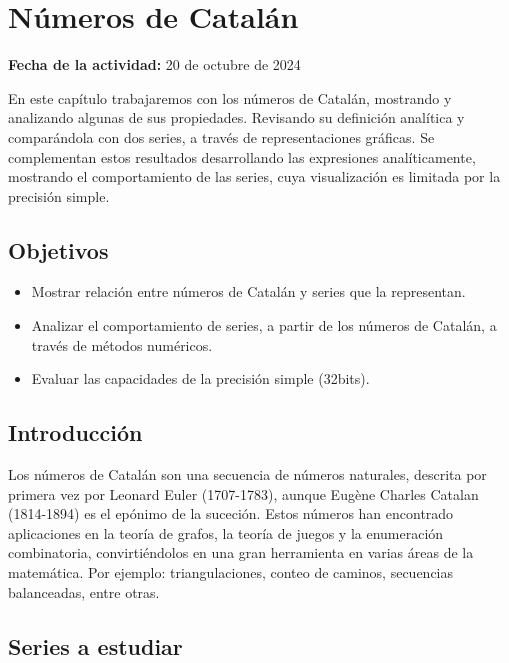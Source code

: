 \documentclass[../portafolio.tex]{subfiles}
\begin{document}
\chapter{Números de Catalán}
\label{g1_ej2}
\hfill \textbf{Fecha de la actividad:} 20 de octubre de 2024

\medskip

En este capítulo trabajaremos con los números de Catalán, mostrando y analizando algunas de sus propiedades. Revisando su definición analítica y comparándola con dos series, a través de representaciones gráficas. Se complementan estos resultados desarrollando las expresiones analíticamente, mostrando el comportamiento de las series, cuya visualización es limitada por la precisión simple.

\section*{Objetivos}
\begin{itemize}
\item Mostrar relación entre números de Catalán y series que la representan.
\item Analizar el comportamiento de series, a partir de los números de Catalán, a través de métodos numéricos.
\item Evaluar las capacidades de la precisión simple (32bits).
\end{itemize}
\section{Introducción}

Los números de Catalán son una secuencia de números naturales, descrita por primera vez por Leonard Euler (1707-1783), aunque Eugène Charles Catalan (1814-1894) es el epónimo de la suceción. Estos números han encontrado aplicaciones en la teoría de grafos, la teoría de juegos y la enumeración combinatoria, convirtiéndolos en una gran herramienta en varias áreas de la matemática. Por ejemplo: triangulaciones, conteo de caminos, secuencias balanceadas, entre otras.
\section{Series a estudiar}
\end{document}
